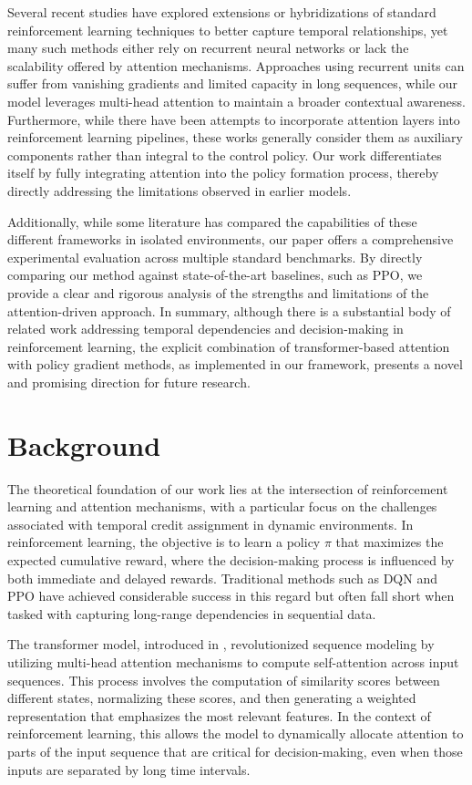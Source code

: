 \documentclass{article}
\begin{document}
Several recent studies have explored extensions or hybridizations of standard reinforcement learning techniques to better capture temporal relationships, yet many such methods either rely on recurrent neural networks or lack the scalability offered by attention mechanisms. Approaches using recurrent units can suffer from vanishing gradients and limited capacity in long sequences, while our model leverages multi-head attention to maintain a broader contextual awareness. Furthermore, while there have been attempts to incorporate attention layers into reinforcement learning pipelines, these works generally consider them as auxiliary components rather than integral to the control policy. Our work differentiates itself by fully integrating attention into the policy formation process, thereby directly addressing the limitations observed in earlier models.

Additionally, while some literature has compared the capabilities of these different frameworks in isolated environments, our paper offers a comprehensive experimental evaluation across multiple standard benchmarks. By directly comparing our method against state-of-the-art baselines, such as PPO, we provide a clear and rigorous analysis of the strengths and limitations of the attention-driven approach. In summary, although there is a substantial body of related work addressing temporal dependencies and decision-making in reinforcement learning, the explicit combination of transformer-based attention with policy gradient methods, as implemented in our framework, presents a novel and promising direction for future research.

\section{Background}
The theoretical foundation of our work lies at the intersection of reinforcement learning and attention mechanisms, with a particular focus on the challenges associated with temporal credit assignment in dynamic environments. In reinforcement learning, the objective is to learn a policy $\pi$ that maximizes the expected cumulative reward, where the decision-making process is influenced by both immediate and delayed rewards. Traditional methods such as DQN and PPO have achieved considerable success in this regard but often fall short when tasked with capturing long-range dependencies in sequential data.

The transformer model, introduced in \cite{ashish_2017_attention}, revolutionized sequence modeling by utilizing multi-head attention mechanisms to compute self-attention across input sequences. This process involves the computation of similarity scores between different states, normalizing these scores, and then generating a weighted representation that emphasizes the most relevant features. In the context of reinforcement learning, this allows the model to dynamically allocate attention to parts of the input sequence that are critical for decision-making, even when those inputs are separated by long time intervals.
\end{document}
